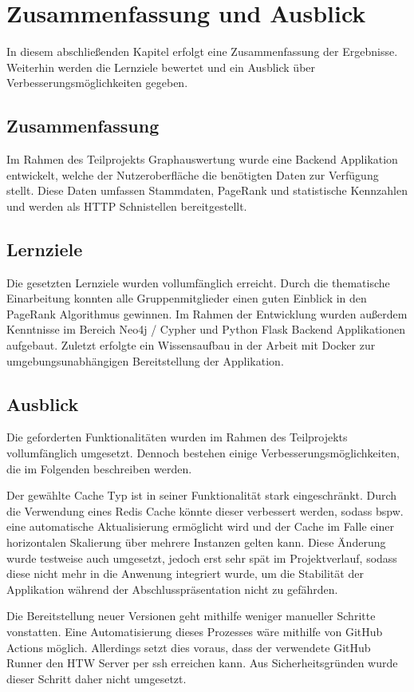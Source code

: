 \section{Zusammenfassung und Ausblick}\label{sec:07_05_zusammenfassung}
In diesem abschließenden Kapitel erfolgt eine Zusammenfassung der Ergebnisse.
Weiterhin werden die Lernziele bewertet und ein Ausblick über Verbesserungsmöglichkeiten gegeben.

\subsection{Zusammenfassung}
Im Rahmen des Teilprojekts Graphauswertung wurde eine Backend Applikation entwickelt, welche der Nutzeroberfläche die benötigten Daten zur Verfügung stellt.
Diese Daten umfassen Stammdaten, PageRank und statistische Kennzahlen und werden als HTTP Schnistellen bereitgestellt.

\subsection{Lernziele}
Die gesetzten Lernziele wurden vollumfänglich erreicht.
Durch die thematische Einarbeitung konnten alle Gruppenmitglieder einen guten Einblick in den PageRank Algorithmus gewinnen.
Im Rahmen der Entwicklung wurden außerdem Kenntnisse im Bereich Neo4j / Cypher und Python Flask Backend Applikationen aufgebaut.
Zuletzt erfolgte ein Wissensaufbau in der Arbeit mit Docker zur umgebungsunabhängigen Bereitstellung der Applikation.

\subsection{Ausblick}
Die geforderten Funktionalitäten wurden im Rahmen des Teilprojekts vollumfänglich umgesetzt.
Dennoch bestehen einige Verbesserungsmöglichkeiten, die im Folgenden beschreiben werden.

Der gewählte Cache Typ ist in seiner Funktionalität stark eingeschränkt.
Durch die Verwendung eines Redis Cache\cite{redis} könnte dieser verbessert werden, sodass bspw. eine automatische Aktualisierung ermöglicht wird und der Cache im Falle einer horizontalen Skalierung über mehrere Instanzen gelten kann.
Diese Änderung wurde testweise auch umgesetzt, jedoch erst sehr spät im Projektverlauf, sodass diese nicht mehr in die Anwenung integriert wurde, um die Stabilität der Applikation während der Abschlusspräsentation nicht zu gefährden.

Die Bereitstellung neuer Versionen geht mithilfe weniger manueller Schritte vonstatten.
Eine Automatisierung dieses Prozesses wäre mithilfe von GitHub Actions möglich.
Allerdings setzt dies voraus, dass der verwendete GitHub Runner den HTW Server per ssh erreichen kann.
Aus Sicherheitsgründen wurde dieser Schritt daher nicht umgesetzt.
